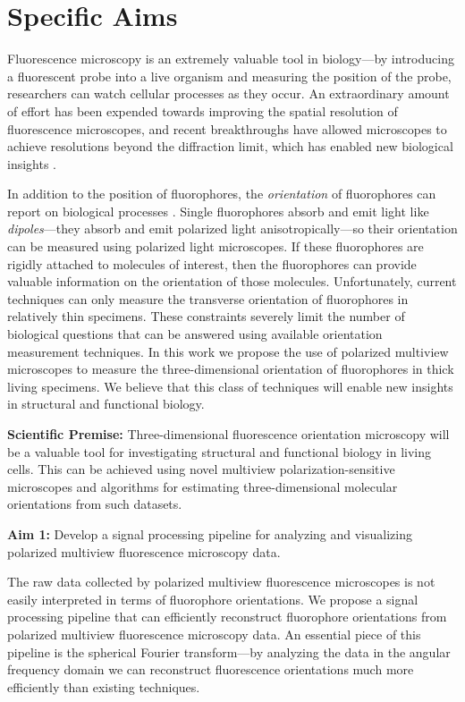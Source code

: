 \documentclass[11pt]{article}
\begin{document}
\section*{Specific Aims}
Fluorescence microscopy is an extremely valuable tool in biology---by
introducing a fluorescent probe into a live organism and measuring the position
of the probe, researchers can watch cellular processes as they occur. An
extraordinary amount of effort has been expended towards improving the spatial
resolution of fluorescence microscopes, and recent breakthroughs have allowed
microscopes to achieve resolutions beyond the diffraction limit, which has
enabled new biological insights \cite{nobel}.

In addition to the position of fluorophores, the \textit{orientation} of
fluorophores can report on biological processes \cite{weiss1999}. Single
fluorophores absorb and emit light like \textit{dipoles}---they absorb and emit
polarized light anisotropically---so their orientation can be measured using
polarized light microscopes. If these fluorophores are rigidly attached to
molecules of interest, then the fluorophores can provide valuable information on
the orientation of those molecules. Unfortunately, current techniques can only
measure the transverse orientation of fluorophores in relatively thin
specimens. These constraints severely limit the number of biological questions
that can be answered using available orientation measurement techniques. In this
work we propose the use of polarized multiview microscopes to measure the
three-dimensional orientation of fluorophores in thick living specimens. We
believe that this class of techniques will enable new insights in structural and
functional biology.

\noindent\textbf{Scientific Premise:} Three-dimensional fluorescence orientation
microscopy will be a valuable tool for investigating structural and functional
biology in living cells. This can be achieved using novel multiview
polarization-sensitive microscopes and algorithms for estimating
three-dimensional molecular orientations from such datasets.

\noindent\textbf{Aim 1:} Develop a signal processing pipeline for analyzing and visualizing polarized multiview fluorescence microscopy data.

The raw data collected by polarized multiview fluorescence microscopes is not
easily interpreted in terms of fluorophore orientations. We propose a signal
processing pipeline that can efficiently reconstruct fluorophore orientations
from polarized multiview fluorescence microscopy data. An essential piece of
this pipeline is the spherical Fourier transform---by analyzing the data in the
angular frequency domain we can reconstruct fluorescence orientations much more
efficiently than existing techniques.
\end{document}
